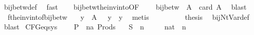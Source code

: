 \begin{isabellebody}
\ bij{\isacharunderscore}{\kern0pt}betw{\isacharunderscore}{\kern0pt}def\ \isamarkupfalse%
\ fast\isanewline
\ \ \isamarkupfalse%
\ bij{\isacharunderscore}{\kern0pt}betw{\isacharunderscore}{\kern0pt}the{\isacharunderscore}{\kern0pt}inv{\isacharunderscore}{\kern0pt}into{\isacharbrackleft}{\kern0pt}OF\ {}{\isacharbrackright}{\kern0pt}\ \isamarkupfalse%
\ {}{\isacharcolon}{\kern0pt}\ {\isachardoublequoteopen}bij{\isacharunderscore}{\kern0pt}betw\ {\isacharquery}{\kern0pt}{\isasymgamma}{\isacharprime}{\kern0pt}\ A\ {\isacharbraceleft}{\kern0pt}{\isachardot}{\kern0pt}{\isachardot}{\kern0pt}{\isacharless}{\kern0pt}\ card\ A{\isacharbraceright}{\kern0pt}{\isachardoublequoteclose}\ \isamarkupfalse%
\ blast\isanewline
\ \ \isamarkupfalse%
\ {}\ f{\isacharunderscore}{\kern0pt}the{\isacharunderscore}{\kern0pt}inv{\isacharunderscore}{\kern0pt}into{\isacharunderscore}{\kern0pt}f{\isacharunderscore}{\kern0pt}bij{\isacharunderscore}{\kern0pt}betw\ \isamarkupfalse%
\ {}{\isacharcolon}{\kern0pt}\ {\isachardoublequoteopen}{\isasymforall}y\ {\isasymin}\ A{\isachardot}{\kern0pt}\ {\isasymgamma}\ {\isacharparenleft}{\kern0pt}{\isacharquery}{\kern0pt}{\isasymgamma}{\isacharprime}{\kern0pt}\ y{\isacharparenright}{\kern0pt}\ {\isacharequal}{\kern0pt}\ y{\isachardoublequoteclose}\ \isamarkupfalse%
\ metis\isanewline
\ \ \isamarkupfalse%
\ {}\ {}\ {}\ {}\ \isamarkupfalse%
\ {\isacharquery}{\kern0pt}thesis\ \isamarkupfalse%
\ bij{\isacharunderscore}{\kern0pt}Nt{\isacharunderscore}{\kern0pt}Var{\isacharunderscore}{\kern0pt}def\ \isamarkupfalse%
\ blast\isanewline
{}\isamarkupfalse%
%
\endisatagproof
{\isafoldproof}%
%
\isadelimproof
\isanewline
%
\endisadelimproof
\isanewline
\isanewline
{}\isamarkupfalse%
\ CFG{\isacharunderscore}{\kern0pt}eq{\isacharunderscore}{\kern0pt}sys\ {\isacharequal}{\kern0pt}\isanewline
\ \ \ P\ {\isacharcolon}{\kern0pt}{\isacharcolon}{\kern0pt}\ {\isachardoublequoteopen}{\isacharparenleft}{\kern0pt}{\isacharprime}{\kern0pt}n{\isacharcomma}{\kern0pt}{\isacharprime}{\kern0pt}a{\isacharparenright}{\kern0pt}\ Prods{\isachardoublequoteclose}\isanewline
\ \ \ S\ {\isacharcolon}{\kern0pt}{\isacharcolon}{\kern0pt}\ {\isacharprime}{\kern0pt}n\isanewline
\ \ \ {\isasymgamma}\ {\isacharcolon}{\kern0pt}{\isacharcolon}{\kern0pt}\ {\isachardoublequoteopen}nat\ {\isasymRightarrow}\ {\isacharprime}{\kern0pt}n{\isachardoublequoteclose}\isanewline

\end{isabellebody}
